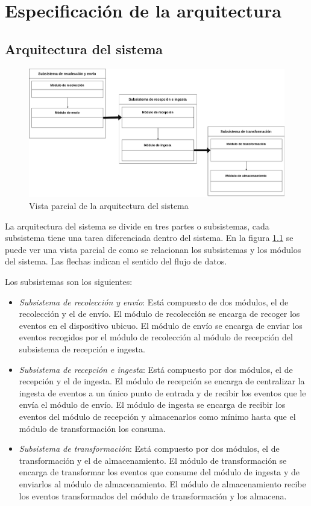 \chapter{Especificación de la arquitectura}

\section{Arquitectura del sistema}

\begin{figure}[!htb]
	\includegraphics[width=\linewidth] {Moduloss-arquitecturaparcial.png}
	\caption{Vista parcial de la arquitectura del sistema}
	\label{fig:arqparcial}
\end{figure}

La arquitectura del sistema se divide en tres partes o subsistemas, cada subsistema tiene una tarea diferenciada dentro del sistema. En la figura \ref{fig:arqparcial} se puede ver una vista parcial de como se relacionan los subsistemas y los módulos del sistema. Las flechas indican el sentido del flujo de datos.
 
 
 Los subsistemas son los siguientes:

\begin{itemize}
	\item \textit{Subsistema de recolección y envío}: Está compuesto de dos módulos, el de recolección y el de envío. El módulo de recolección se encarga de recoger los eventos en el dispositivo ubicuo. El módulo de envío se encarga de enviar los eventos recogidos por el módulo de recolección al módulo de recepción del subsistema de recepción e ingesta.
	
	\item \textit{Subsistema de recepción e ingesta}: Está compuesto por dos módulos, el de recepción y el de ingesta. El módulo de recepción se encarga de centralizar la ingesta de eventos a un único punto de entrada y  de recibir los eventos que le envía el módulo de envío. El módulo de ingesta se encarga de recibir los eventos del módulo de recepción y almacenarlos como mínimo hasta que el módulo de transformación los consuma.

	\item \textit{Subsistema de transformación}:  Está compuesto por dos módulos, el de transformación y el de almacenamiento. El módulo de transformación se encarga de transformar los eventos que consume del módulo de ingesta y de enviarlos al módulo de almacenamiento. El módulo de almacenamiento recibe los eventos transformados del módulo de transformación y los almacena.
\end{itemize}

